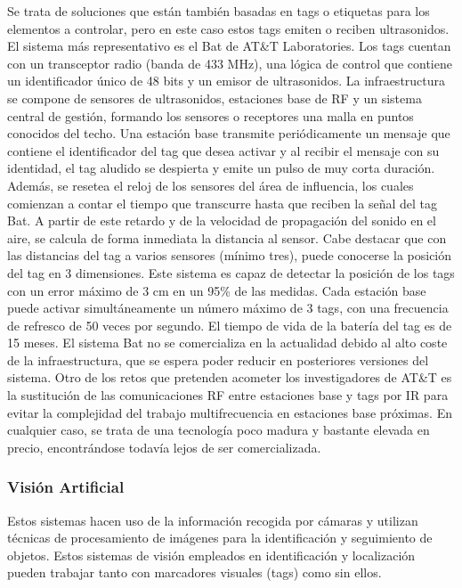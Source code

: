 Se trata de soluciones que están también basadas en tags o etiquetas para los elementos a controlar, pero en este caso estos tags emiten o reciben ultrasonidos. El sistema más representativo es el Bat de AT\&T Laboratories. Los tags cuentan con un transceptor radio (banda de 433 MHz), una lógica de control que contiene un identificador único de 48 bits y un emisor de ultrasonidos. La infraestructura se compone de sensores de ultrasonidos, estaciones base de RF y un sistema central de gestión, formando los sensores o receptores una malla en puntos conocidos del techo. Una estación base transmite periódicamente un mensaje que contiene el identificador del tag que desea activar y al recibir el mensaje con su identidad, el tag aludido se despierta y emite un pulso de muy corta duración. Además, se resetea el reloj de los sensores del área de influencia, los cuales comienzan a contar el tiempo que transcurre hasta que reciben la señal del tag Bat. A partir de este retardo y de la velocidad de propagación del sonido en el aire, se calcula de forma inmediata la distancia al sensor. Cabe destacar que con las distancias del tag a varios sensores (mínimo tres), puede conocerse la posición del tag en 3 dimensiones. Este sistema es capaz de detectar la posición de los tags con un error máximo de 3 cm en un 95\% de las medidas. Cada estación base puede activar simultáneamente un número máximo de 3 tags, con una frecuencia de refresco de 50 veces por segundo. El tiempo de vida de la batería del tag es de 15 meses. El sistema Bat no se comercializa en la actualidad debido al alto coste de la infraestructura, que se espera poder reducir en posteriores versiones del sistema. Otro de los retos que pretenden acometer los investigadores de AT\&T es la sustitución de las comunicaciones RF entre estaciones base y tags por IR para evitar la complejidad del trabajo multifrecuencia en estaciones base próximas. En cualquier caso, se trata de una tecnología poco madura y bastante elevada en precio, encontrándose todavía lejos de ser comercializada. 

\subsubsection{Visión Artificial}

Estos sistemas hacen uso de la información recogida por cámaras y utilizan técnicas de procesamiento de imágenes para la identificación y seguimiento de objetos. Estos sistemas de visión empleados en identificación y localización pueden trabajar tanto con marcadores visuales (tags) como sin ellos. 

